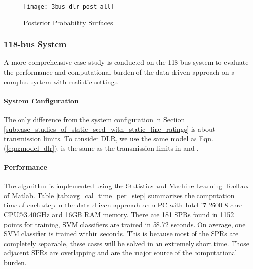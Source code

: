 \documentclass[letterpaper, 11pt]{article}
\theoremstyle{plain}
\theoremstyle{definition}
\begin{document}
\begin{figure}[htbp]
  \centering
  \texttt{[image: 3bus\_dlr\_post\_all]} 
  \caption{Posterior Probability Surfaces}
  \label{fig:3bus_dlr_post_all} 
\end{figure}








\subsubsection{118-bus System} \label{ssub:118_bus_system_dlr}
A more comprehensive case study is conducted on the 118-bus system to evaluate the performance and computational burden of the data-driven approach on a complex system with realistic settings.


\paragraph{System Configuration} \label{par:system_configuration}
The only difference from the system configuration in Section \ref{sub:case_studies_of_static_sced_with_static_line_ratings} is about transmission limits. To consider DLR, we use the same model as Eqn. (\ref{eqn:model_dlr}).  is the same as the transmission limits in \cite{Technology} and .











\paragraph{Performance} \label{par:classification_accuracy}
The algorithm is implemented using the Statistics and Machine Learning Toolbox of Matlab.
Table \ref{tab:avg_cal_time_per_step} summarizes the computation time of each step in the data-driven approach on a PC with Intel i7-2600 8-core CPU@3.40GHz and 16GB RAM memory. There are 181 SPRs found in 1152 points for training,  SVM classifiers are trained in 58.72 seconds. On average, one SVM classifier is trained within  seconds. This is because most of the SPRs are completely separable, these cases will be solved in an extremely short time. Those adjacent SPRs are overlapping and are the major source of the computational burden.
\end{document}
